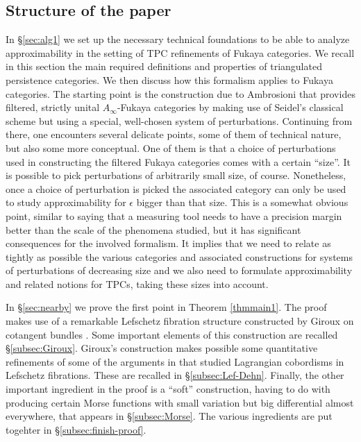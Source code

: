  \subsection{Structure of the paper} In \S\ref{sec:alg1} we set up the necessary technical foundations to be able to analyze approximability in the setting of TPC refinements of Fukaya categories. We recall in this section the main required definitions and properties of triangulated persistence categories. We then discuss how this formalism applies to Fukaya categories.    The starting point is the construction due to Ambrosioni \cite{Amb:fil-fuk} that provides filtered, strictly unital $A_{\infty}$-Fukaya categories by making use of Seidel's classical scheme but using a special,  well-chosen system of perturbations.  Continuing from there, one encounters several delicate points, some of them of technical nature, but also some more conceptual. One of them is that a choice of perturbations used in constructing  the filtered Fukaya categories comes with a certain ``size''.  It is possible to pick perturbations of arbitrarily small size, of course. Nonetheless, once a choice of perturbation is picked
the associated category can only be used to study approximability for $\epsilon$ bigger than that size. This is a somewhat obvious point, similar to saying that a measuring tool needs to have  a precision margin better than the scale of the phenomena studied, but it has significant consequences for the involved formalism. It implies that we need to relate as tightly as possible the various categories and associated constructions for systems of perturbations of decreasing size and  we also need to formulate approximability and related notions for TPCs,
taking these sizes into account. 

In \S\ref{sec:nearby} we prove the first point in Theorem \ref{thmmain1}. The proof makes use of a remarkable Lefschetz fibration structure constructed by Giroux on cotangent bundles \cite{Gir:Lef-cot}. Some important elements of this construction are recalled \S\ref{subsec:Giroux}.   Giroux's construction makes possible some quantitative refinements of some of the arguments in \cite{Bi-Co:lefcob-pub} that studied Lagrangian cobordisms in Lefschetz fibrations. These are recalled in \S\ref{subsec:Lef-Dehn}. Finally, the  other important ingredient in the proof is a  ``soft'' construction, having to  do with producing certain Morse functions with small variation but big differential almost everywhere, that appears in \S\ref{subsec:Morse}. The various ingredients are put togehter in \S\ref{subsec:finish-proof}.

